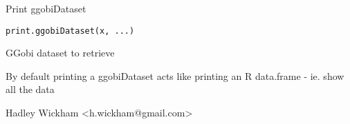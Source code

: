 \begin{Description}\relax
Print ggobiDataset
\end{Description}
\begin{Usage}
\begin{verbatim}print.ggobiDataset(x, ...)\end{verbatim}
\end{Usage}
\begin{Arguments}
\begin{ldescription}
\item[\code{x}] GGobi dataset to retrieve
\item[\code{...}] 
\end{ldescription}
\end{Arguments}
\begin{Details}\relax
By default printing a ggobiDataset acts like
printing an R data.frame - ie. show all the data
\end{Details}
\begin{Author}\relax
Hadley Wickham <h.wickham@gmail.com>
\end{Author}
\begin{Examples}
\begin{ExampleCode}\end{ExampleCode}
\end{Examples}

